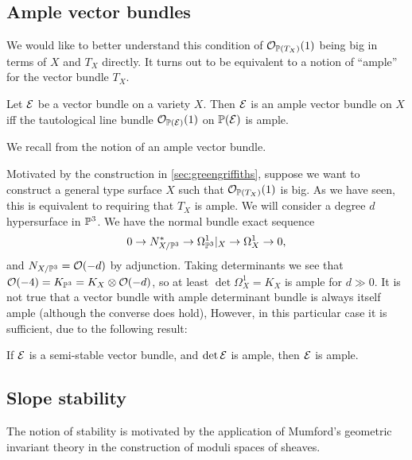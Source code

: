 \subsection{Ample vector bundles}

We would like to better understand this condition of $\O_{\P(T_X)}(1)$ being
big in terms of $X$ and $T_X$ directly. It turns out to be equivalent to a
notion of ``ample'' for the vector bundle $T_X$.

\begin{proposition}
    Let $\calE$ be a vector bundle on a variety $X$. Then $\calE$ is an ample
    vector bundle on $X$ iff the tautological line bundle $\O_{\P(\calE)}(1)$ on
    $\P(\calE)$ is ample.
\end{proposition}

We recall from \cite{hartshorne_66} the notion of an ample vector bundle.


Motivated by the construction in \cref{sec:greengriffiths}, suppose we want to
construct a general type surface $X$ such that $\O_{\P(T_X)}(1)$ is big. As we
have seen, this is equivalent to requiring that $T_X$ is ample. We will consider
a degree $d$ hypersurface in $\P^3$. We have the normal bundle exact sequence
\begin{equation*}
    0 \to N_{X/\P^3}^* \to \Omega^1_{\P^3}|_X \to \Omega^1_X \to 0,
\end{equation*}
and $N_{X/\P^3}=\O(-d)$ by adjunction. Taking determinants we see that
$\O(-4)=K_{\P^3}=K_X\otimes\O(-d)$, so at least $\det\Omega^1_X=K_X$ is ample
for $d\gg0$. It is not true that a vector bundle with ample determinant bundle
is always itself ample (although the converse does hold), However, in this
particular case it is sufficient, due to the following result:


\begin{proposition}\label{prop:stable ample}
    If $\calE$ is a semi-stable vector bundle, and $\det\calE$ is ample, then
    $\calE$ is ample.
\end{proposition}


\subsection{Slope stability}

The notion of stability is motivated by the application of Mumford's geometric
invariant theory in the construction of moduli spaces of sheaves.

